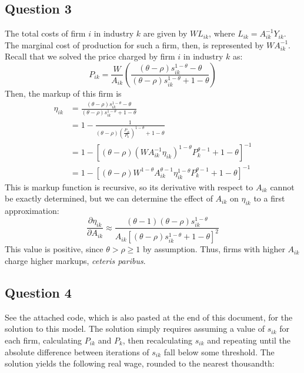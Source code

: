 \documentclass{article}
\begin{document}
\subsection*{Question 3}
The total costs of firm $i$ in industry $k$ are given by $WL_{ik}$, where ${L_{ik} = A_{ik}^{-1}Y_{ik}}$. The marginal cost of production for such a firm, then, is represented by ${WA_{ik}^{-1}}$. Recall that we solved the price charged by firm $i$ in industry $k$ as:
\[
	P_{ik} = \frac{W}{A_{ik}}\left(\frac{(\theta-\rho)s_{ik}^{1-\theta} - \theta}{(\theta-\rho)s_{ik}^{1-\theta} + 1-\theta}\right)
\]
Then, the markup of this firm is
\begin{align*}
	\eta_{ik} 	&= \frac{(\theta-\rho)s_{ik}^{1-\theta} - \theta}{(\theta-\rho)s_{ik}^{1-\theta} + 1-\theta}					\\
				&= 1 - \frac{1}{(\theta-\rho)\left(\frac{P_{ik}}{P_k}\right)^{1-\theta} + 1-\theta}								\\
				&= 1- \left[(\theta-\rho)\left(WA_{ik}^{-1}\eta_{ik}\right)^{1-\theta}P_k^{\theta-1} + 1-\theta\right]^{-1}		\\
				&= 1- \left[(\theta-\rho)W^{1-\theta}A_{ik}^{\theta-1}\eta_{ik}^{1-\theta}P_k^{\theta-1} + 1-\theta\right]^{-1}	
\end{align*}
This is markup function is recursive, so its derivative with respect to $A_{ik}$ cannot be exactly determined, but we can determine the effect of $A_{ik}$ on $\eta_{ik}$ to a first approximation:
\[
	\frac{\partial \eta_{ik}}{\partial A_{ik}} \approx \frac{(\theta-1)(\theta-\rho)s_{ik}^{1-\theta}}{A_{ik}\left[(\theta-\rho)s_{ik}^{1-\theta}+1-\theta\right]^2}
\]
This value is positive, since ${\theta>\rho\geq 1}$ by assumption. Thus, firms with higher $A_{ik}$ charge higher markups, \textit{ceteris paribus}.


\subsection*{Question 4}

See the attached code, which is also pasted at the end of this document, for the solution to this model. The solution simply requires assuming a value of $s_{ik}$ for each firm, calculating $P_{ik}$ and $P_k$, then recalculating $s_{ik}$ and repeating until the absolute difference between iterations of $s_{ik}$ fall below some threshold. The solution yields the following real wage, rounded to the nearest thousandth:
\end{document}
